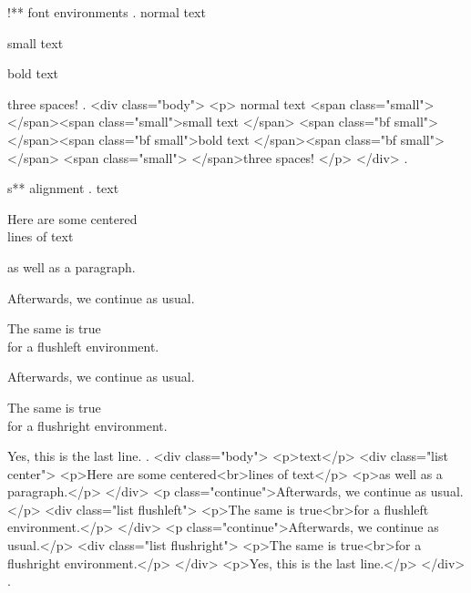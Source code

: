 !** font environments
.
normal text \begin{small}
    small text
    \begin{bfseries}
        bold text
    \end{bfseries}
\end{small}
  three spaces!
.
<div class="body">
<p>
normal text <span class="small">​ </span><span class="small">small text </span>
<span class="bf small">​ </span><span class="bf small">bold text </span><span class="bf small">​ </span>
<span class="small">​ </span>three spaces!
</p>
</div>
.


s** alignment
.
text
\begin{center}
    Here are some centered\\
    lines of text

    as well as a paragraph.
\end{center}
Afterwards, we continue as usual.
\begin{flushleft}
    The same is true\\
    for a flushleft environment.
\end{flushleft}
Afterwards, we continue as usual.
\begin{flushright}
    The same is true\\
    for a flushright environment.
\end{flushright}

Yes, this is the last line.
.
<div class="body">
<p>text</p>
<div class="list center">
<p>Here are some centered<br>lines of text</p>
<p>as well as a paragraph.</p>
</div>
<p class="continue">Afterwards, we continue as usual.</p>
<div class="list flushleft">
<p>The same is true<br>for a ﬂushleft environment.</p>
</div>
<p class="continue">Afterwards, we continue as usual.</p>
<div class="list flushright">
<p>The same is true<br>for a ﬂushright environment.</p>
</div>
<p>Yes, this is the last line.</p>
</div>
.


